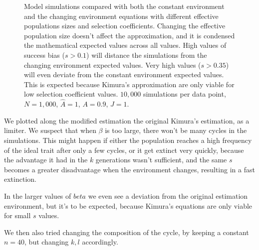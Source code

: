 \documentclass[11pt]{article}
\begin{document}
\begin{figure}[t]
\begin{center}
\begin{subfigure}[a]{0.49\linewidth}
   \end{subfigure}
  \end{center}
  \caption{Model simulations compared with both the constant environment and the changing environment equations with different effective populations sizes and selection coefficients. Changing the effective population size doesn't affect the approximation, and it is condensed the mathematical expected values across all values. High values of success bias ($s>0.1$) will distance the simulations from the changing environment expected values. Very high values ($s>0.35$) will even deviate from the constant environment expected values. This is expected because Kimura's approximation are only viable for low selection coefficient values.
  $10,000$ simulations per data point, $N=1,000$, $\hat{A}=1$, $A=0.9$, $J=1$.}
  \label{fig:ch_env_alpha_beta}
\end{figure}

We plotted along the modified estimation the original Kimura's estimation, as a limiter. We suspect that when $\beta$ is too large, there won't be many cycles in the simulations. This might happen if either the population reaches a high frequency of the ideal trait after only a few cycles, or it get extinct very quickly, because the advantage it had in the $k$ generations wasn't sufficient, and the same $s$ becomes a greater disadvantage when the environment changes, resulting in a fast extinction.

In the larger values of $beta$ we even see a deviation from the original estimation environment, but it's to be expected, because Kimura's equations are only viable for small $s$ values.

We then also tried changing the composition of the cycle, by keeping a constant $n=40$, but changing $k,l$ accordingly.
\end{document}
